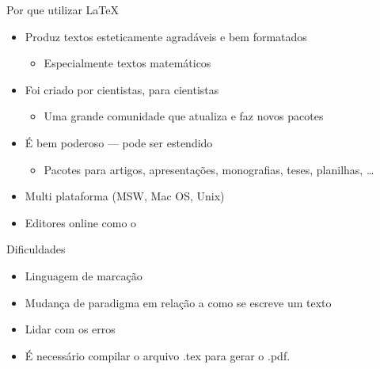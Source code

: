 \documentclass{beamer}
\subtitle{Parte 1: O básico}
\begin{document}
\begin{frame}
\titlepage
\end{frame}

\begin{frame}{Por que utilizar \LaTeX}

\begin{itemize}
  \item Produz  textos esteticamente agradáveis e bem formatados
  \begin{itemize}
  \item Especialmente textos matemáticos
\end{itemize}
  \item Foi criado por cientistas, para cientistas
  \begin{itemize}
  \item Uma grande comunidade que atualiza e faz novos pacotes
\end{itemize}
  \item É bem poderoso --- pode ser estendido
  \begin{itemize}
  \item Pacotes para artigos, apresentações, monografias, teses, planilhas, \ldots
\end{itemize}
\item Multi plataforma (MSW, Mac OS, Unix)
\item Editores online como o \href{https://www.writelatex.com/signup?ref=9868d6ae68e9}{\wllogo}
\end{itemize}


\begin{block}{Dificuldades}
\begin{itemize}
  \item Linguagem de marcação
  \item Mudança de paradigma em relação a como se escreve um texto
  \item Lidar com os erros
  \item É necessário compilar o arquivo .tex para gerar o .pdf.
\end{itemize}
\end{block}

\end{frame}
\end{document}
